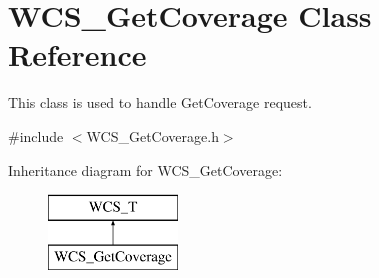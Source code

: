 \hypertarget{classWCS__GetCoverage}{
\section{WCS\_\-GetCoverage Class Reference}
\label{classWCS__GetCoverage}
}


This class is used to handle GetCoverage request.  




{\ttfamily \#include $<$WCS\_\-GetCoverage.h$>$}

Inheritance diagram for WCS\_\-GetCoverage:\begin{figure}[H]
\begin{center}
\leavevmode
\includegraphics[height=2.000000cm]{classWCS__GetCoverage}
\end{center}
\end{figure}
